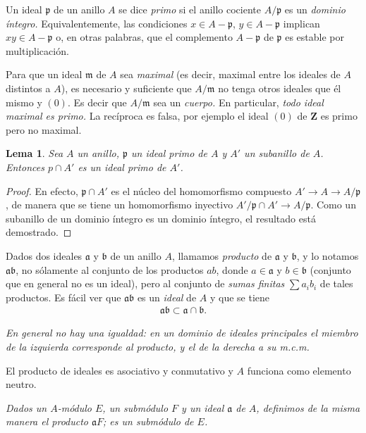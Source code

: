 \documentclass[oneside,bibtotoc,leqno,spanish]{amsbook}
\newcommand{\ZZ}{\mathbf{Z}}
\newcommand{\idl}[1]{\mathfrak{#1}}
\renewcommand{\to}[1][]{\xrightarrow{#1}}
\numberwithin{equation}{section}
\newenvironment{comm}%
	{\begin{trivlist}\item\small\itshape}
	{\end{trivlist}}
\theoremstyle{defi}
\theoremstyle{note}
\newtheorem{lemma}{Lema}
\theoremstyle{rem}
\numberwithin{theorem}{section}
\numberwithin{proposition}{section}
\numberwithin{definition}{section}
\numberwithin{lemma}{section}
\numberwithin{corollary}{section}
\numberwithin{example}{section}
\numberwithin{footnote}{section}%
\begin{document}
Un ideal $\idl{p}$ de un anillo $A$ se dice {\em primo} si el anillo cociente $A/\idl{p}$
es un {\em dominio \'integro.} Equivalentemente, las condiciones $x\in A-\idl{p}$,
$y\in A-\idl{p}$ implican $xy\in A-\idl{p}$ o, en otras palabras, que el complemento
$A-\idl{p}$ de $\idl{p}$ es estable por multiplicaci\'on.

Para que un ideal $\idl{m}$ de $A$ sea {\em maximal} (es decir, maximal entre los ideales de
$A$ distintos a $A$), es necesario y suficiente que $A/\idl{m}$ no tenga otros ideales que \'el mismo
y $(0)$. Es decir que $A/\idl{m}$ sea un {\em cuerpo.}  En particular,
{\em todo ideal maximal es primo.} La rec\'iproca es falsa, por ejemplo el ideal $(0)$ de $\ZZ$
es primo pero no maximal.

\begin{lemma}\label{lem3.3.1}
Sea $A$ un anillo, $\idl{p}$ un ideal primo de $A$ y $A'$ un subanillo de $A$. Entonces
$p\cap A'$ es un ideal primo de $A'$.
\end{lemma}

\begin{proof}
En efecto, $\idl{p}\cap A'$ es el n\'ucleo del homomorfismo compuesto $A'\to A\to A/\idl{p}$,
de manera que se tiene un homomorfismo inyectivo $A'/\idl{p}\cap A'\to A/\idl{p}$. Como un
subanillo de un dominio \'integro es un dominio \'integro, el resultado est\'a demostrado.
\end{proof}

Dados dos ideales $\idl{a}$ y $\idl{b}$ de un anillo $A$, llamamos {\em producto} de $\idl{a}$
y $\idl{b}$, y lo notamos $\idl{a}\idl{b}$, no s\'olamente al conjunto de los productos
$ab$, donde $a\in\idl{a}$ y $b\in\idl{b}$ (conjunto que en general no es un ideal), pero al
conjunto de {\em sumas finitas} $\sum a_{i}b_{i}$ de tales productos. Es f\'acil ver que
$\idl{a}\idl{b}$ es un {\em ideal} de $A$ y que se tiene
\begin{gather*}
\idl{a}\idl{b}\subset\idl{a}\cap\idl{b}.
\end{gather*}

\begin{comm}
En general no hay una igualdad: en un dominio de ideales principales el miembro de la izquierda
corresponde al producto, y el de la derecha a su m.c.m.
\end{comm}
El producto de ideales es asociativo y conmutativo y $A$ funciona como elemento neutro.

\begin{comm}
Dados un $A$-m\'odulo $E$, un subm\'odulo $F$ y un ideal $\idl{a}$ de $A$, definimos
de la misma manera el producto $\idl{a}F$; es un subm\'odulo de $E$.
\end{comm}
\end{document}
